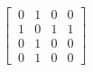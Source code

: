 \documentclass[preview]{standalone}
\begin{document}
\begin{center}
$\begin{bmatrix}\
                      0 & 1 & 0 & 0\\\
                      1 & 0 & 1 & 1\\\
                      0 & 1 & 0 & 0\\\
                      0 & 1 & 0 & 0\end{bmatrix}$
\end{center}
\end{document}

